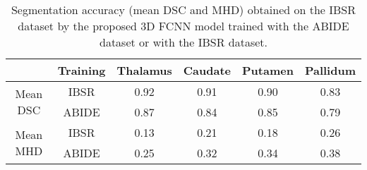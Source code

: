 \documentclass[twoside,fleqn,espcrc2]{elsarticle}
\begin{document}
\begin{comment}
\begin{table}[ht!]
\begin{footnotesize}
\centering
\renewcommand{\arraystretch}{1.2}
\begin{tabular}{ccccc}
\toprule
\multicolumn{5}{c}{Mean DSC} \\ 
\midrule
        \textbf{Training dataset} & \textbf{Thalamus} & \textbf{Caudate} & \textbf{Putamen} & \textbf{Pallidum} \\ \hline
IBSR   &  0.92 ($\pm$ 0.02) & 0.91 ($\pm$ 0.06) & 0.90 ($\pm$ 0.04) & 0.83 ($\pm$ 0.05)\\
ABIDE  &  0.87 ($\pm$ 0.05) & 0.84 ($\pm$ 0.05) & 0.85 ($\pm$ 0.05) & 0.79 ($\pm$ 0.06)\\ 
\bottomrule
& & & & \\
\toprule
\multicolumn{5}{c}{Mean MHD (mm)} \\ 
\midrule
\textbf{Training} & \textbf{Thalamus} & \textbf{Caudate} & \textbf{Putamen} & \textbf{Pallidum} \\ 
\midrule
IBSR  & 0.13 ($\pm$ 0.05) & 0.21 ($\pm$ 0.20) & 0.18 ($\pm$ 0.16) & 0.26 ($\pm$ 0.12)\\
ABIDE & 0.25 ($\pm$ 0.13) & 0.32 ($\pm$ 0.16) & 0.34 ($\pm$ 0.14) & 0.38 ($\pm$ 0.17)\\
\bottomrule
\end{tabular}
\caption{Segmentation accuracy (mean DSC and MHD) obtained on the IBSR dataset by the proposed 3D FCNN model trained with the ABIDE dataset or with the IBSR dataset.}
\label{table_IBSR_ABIDE}
\end{footnotesize}
\end{table}
\end{comment}

\begin{table}[ht!]
\begin{footnotesize}
\centering
\renewcommand{\arraystretch}{1.2}
\begin{tabular}{cccccc}
\toprule
 & \textbf{Training} & \textbf{Thalamus} & \textbf{Caudate} & \textbf{Putamen} & \textbf{Pallidum} \\ \hline
\multirow{2}{*}{Mean DSC} & IBSR &  0.92  & 0.91 & 0.90 &  0.83\\
& ABIDE  &  0.87  &   0.84    &  0.85   &   0.79 \\ 
\midrule
\multirow{2}{*}{Mean MHD}  & IBSR  & 0.13  &  0.21  & 0.18  & 0.26 \\
& ABIDE  &  0.25  & 0.32  & 0.34  &  0.38 \\
\bottomrule
\end{tabular}
\caption{Segmentation accuracy (mean DSC and MHD) obtained on the IBSR dataset by the proposed 3D FCNN model trained with the ABIDE dataset or with the IBSR dataset.}
\label{table_IBSR_ABIDE}
\end{footnotesize}
\end{table}
\end{document}
